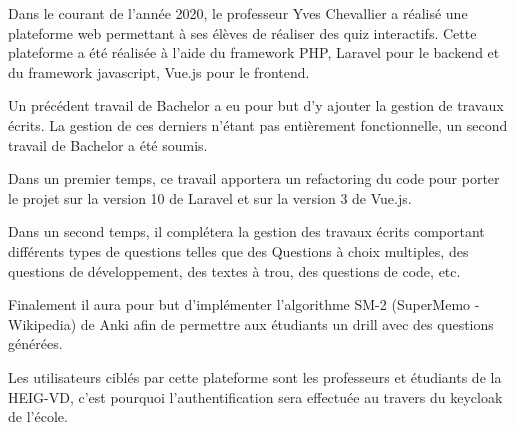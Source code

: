Dans le courant de l'année 2020, le professeur Yves Chevallier a réalisé une plateforme web permettant à ses élèves de réaliser des quiz interactifs. Cette plateforme a été réalisée à l'aide du framework PHP, Laravel pour le backend et du framework javascript, Vue.js pour le frontend.

Un précédent travail de Bachelor a eu pour but d'y ajouter la gestion de travaux écrits. La gestion de ces derniers n'étant pas entièrement fonctionnelle, un second travail de Bachelor a été soumis.

Dans un premier temps, ce travail apportera un refactoring du code pour porter le projet sur la version 10 de Laravel et sur la version 3 de Vue.js.

Dans un second temps, il complétera la gestion des travaux écrits comportant différents types de questions telles que des Questions à choix multiples, des questions de développement, des textes à trou, des questions de code, etc.

Finalement il aura pour but d'implémenter l'algorithme SM-2 (SuperMemo - Wikipedia) de Anki afin de permettre aux étudiants un drill avec des questions générées.

Les utilisateurs ciblés par cette plateforme sont les professeurs et étudiants de la HEIG-VD, c'est pourquoi l'authentification sera effectuée au travers du keycloak de l'école.

\asterism
